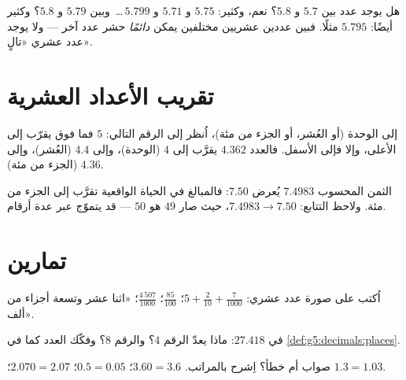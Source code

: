 \begin{example}\label{ex:g5:decimals:between}
هل يوجد عدد بين $5.7$ و $5.8$؟ نعم، وكثير: $5.75$
و $5.71$ و $5.799$\,\dots\ وبين $5.79$ و $5.8$؟ وكثير أيضًا:
$5.795$ مثلًا. فبين عددين عشريين مختلفين يمكن \emph{دائمًا}
حشر عدد آخر --- ولا يوجد عدد عشري «تالٍ».
\end{example}

\section{تقريب الأعداد العشرية}

\begin{definition}[التقريب]\label{def:g5:decimals:round}
 إلى الوحدة (أو العُشر، أو الجزء من مئة)، اُنظر إلى الرقم
التالي: $5$ فما فوق يقرّب إلى الأعلى، وإلا فإلى الأسفل. فالعدد $4.362$
يقرَّب إلى $4$ (الوحدة)، وإلى $4.4$ (العُشر)، وإلى $4.36$ (الجزء من مئة).
\end{definition}

\begin{example}\label{ex:g5:decimals:money}
الثمن المحسوب $7.4983$ يُعرض $7.50$: فالمبالغ في الحياة
الواقعية تقرَّب إلى الجزء من مئة. ولاحظ التتابع: $7.4983 \to
7.50$، حيث صار $49$ هو $50$ ---  قد يتموّج عبر
عدة أرقام.
\end{example}

\section{تمارين}

\begin{exercise}[$\star$]\label{exo:g5:decimals:1}
اُكتب على صورة عدد عشري: $5 + \frac{2}{10} + \frac{7}{1000}$؛
\quad $\frac{85}{100}$؛ \quad $\frac{4\,507}{1000}$؛ \quad «اثنا عشر
وتسعة أجزاء من ألف».
\end{exercise}

\begin{exercise}[$\star$]\label{exo:g5:decimals:2}
في $27.418$: ماذا يعدّ الرقم $4$؟ والرقم $8$؟ وفكّك العدد
كما في \cref{def:g5:decimals:places}.
\end{exercise}

\begin{exercise}[$\star$]\label{exo:g5:decimals:3}
صواب أم خطأ؟ اِشرح بالمراتب.
$3.60 = 3.6$؛ \quad $0.5 = 0.05$؛ \quad $2.070 = 2.07$؛ \quad
$1.3 = 1.03$.
\end{exercise}

